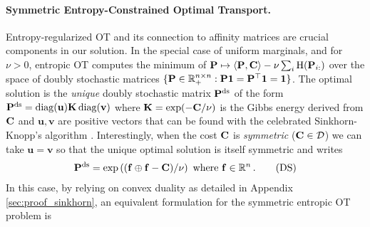 \paragraph{Symmetric Entropy-Constrained Optimal Transport.} Entropy-regularized
OT \citep{peyre2019computational} and its connection to affinity
matrices are crucial components in our solution. In the special case of uniform
marginals, and for $\nu > 0$, entropic OT computes the minimum of $\mathbf{P}
\mapsto \langle \mathbf{P}, \mathbf{C} \rangle -\nu \sum_{i} \operatorname{H}(\mathbf{P}_{i:})$
over the space of doubly stochastic matrices $\{\mathbf{P} \in \mathbb{R}_{+}^{n \times n} :
\mathbf{P} \bm{1} = \mathbf{P}^\top \bm{1} =\bm{1}\}$. The optimal solution is the
\emph{unique} doubly stochastic matrix $\mathbf{P}^{\mathrm{ds}}$ of the form $\mathbf{P}^{\mathrm{ds}}=\operatorname{diag}(\mathbf{u})\mathbf{K}
\operatorname{diag}(\mathbf{v})$ where $\mathbf{K} = \exp(-\mathbf{C}/\nu)$ is the Gibbs energy derived from
$\mathbf{C}$ and $\mathbf{u}, \mathbf{v}$ are positive vectors that can be found with
the celebrated Sinkhorn-Knopp’s algorithm \citep{cuturi2013sinkhorn,
sinkhorn1964relationship}. Interestingly, when the cost $\mathbf{C}$ is \emph{symmetric}
(\eg $\mathbf{C} \in \mathcal{D}$) we can take $\mathbf{u} = \mathbf{v}$ \cite[Section
5.2]{idel2016review} so that the unique optimal solution is itself symmetric and writes  
\begin{align}\label{eq:plan_sym_sinkhorn}
    \mathbf{P}^{\mathrm{ds}} = \exp \left((\mathbf{f} \oplus \mathbf{f} - \mathbf{C}) / \nu \right) \text{ where } \mathbf{f} \in \mathbb{R}^n \,.
\tag{DS}
\end{align}
In this case, by relying on convex duality as detailed in Appendix \ref{sec:proof_sinkhorn}, an equivalent formulation for the symmetric entropic OT problem is
